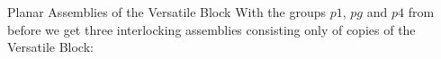 \documentclass{beamer}
\numberwithin{equation}{aufgabe}
\begin{document}
\begin{frame}{Planar Assemblies of the Versatile Block}
    With the groups $p1$, $pg$ and $p4$ from before we get three interlocking assemblies consisting only of copies of the Versatile Block:\\
    \begin{center}
\end{center}
\end{frame}
\end{document}
